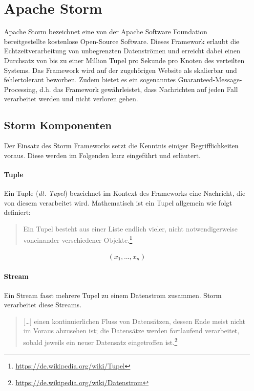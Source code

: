 \documentclass[a4paper,11pt]{scrartcl}
\begin{document}

  \section{Apache Storm}

  Apache Storm bezeichnet eine von der Apache Software Foundation
  bereitgestellte kostenlose Open-Source Software. Dieses Framework
  erlaubt die Echtzeitverarbeitung von unbegrenzten Datenströmen und
  erreicht dabei einen Durchsatz von bis zu einer Million Tupel pro
  Sekunde pro Knoten des verteilten Systems. Das Framework wird auf
  der zugehörigen Website als skalierbar und fehlertolerant beworben.
  Zudem bietet es ein sogenanntes Guaranteed-Message-Processing, d.h.
  das Framework gewährleistet, dass Nachrichten auf jeden Fall
  verarbeitet werden und nicht verloren gehen.\cite{apachestorm}

  \subsection{Storm Komponenten}

  Der Einsatz des Storm Frameworks setzt die Kenntnis einiger
  Begrifflichkeiten voraus. Diese werden im Folgenden kurz eingeführt
  und erläutert.\cite[S.~53ff.]{stormpresentation2011}

  \paragraph{Tuple}
  Ein Tuple (\textit{dt. Tupel}) bezeichnet im Kontext des Frameworks eine
  Nachricht, die von diesem verarbeitet wird. Mathematisch ist ein Tupel
  allgemein wie folgt definiert:
  \begin{quote}
    Ein Tupel besteht aus einer Liste endlich vieler, nicht
    notwendigerweise voneinander verschiedener
    Objekte.\footnote{\url{https://de.wikipedia.org/wiki/Tupel}}
  \end{quote}
  \setlength{\abovedisplayskip}{-20pt}
  \setlength{\abovedisplayshortskip}{-20pt}

  \begin{align*}
    (x_1, \ldots , x_n)
  \end{align*}

  \paragraph{Stream}
  Ein Stream fasst mehrere Tupel zu einem Datenstrom zusammen. Storm
  verarbeitet diese Streams.
  \begin{quote}
    [\ldots] einen kontinuierlichen Fluss von Datensätzen, dessen Ende
    meist nicht im Voraus abzusehen ist; die Datensätze werden
    fortlaufend verarbeitet, sobald jeweils ein neuer Datensatz
    eingetroffen ist.\footnote{\url{https://de.wikipedia.org/wiki/Datenstrom}}
  \end{quote}
\end{document}
